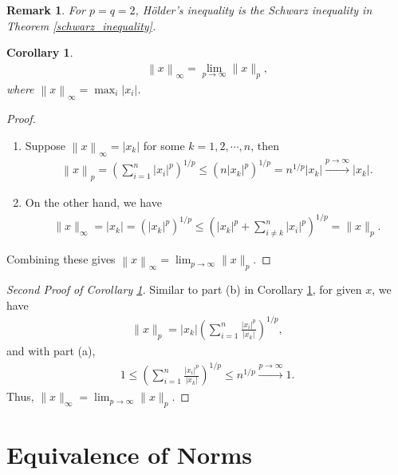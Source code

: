 \documentclass[11pt]{book}
\newtheorem{corollary}{Corollary}[theorem]
\newtheorem{remark}{Remark}[chapter]
\theoremstyle{definition}
\numberwithin{equation}{chapter}
\begin{document}
\begin{remark}
For $p = q = 2$, Hölder's inequality is the Schwarz inequality in Theorem \ref{schwarz_inequality}.
\end{remark}

\medskip

\begin{corollary}\label{norm_limit_corollary}
\begin{align*}
    \left\|x\right\|_\infty = \lim_{p\to\infty} \|x\|_p,
\end{align*}
where $\left\|x\right\|_\infty = \max_{i}|x_i|$.
\end{corollary}
\begin{proof}
~\begin{enumerate}[label=(\alph*)]
    \item Suppose $\left\|x\right\|_\infty = |x_k|$ for some $k = 1,2,\cdots, n$, then
    \begin{align*}
        \left\|x\right\|_p = \left(\sum^n_{i=1}|x_i|^p\right)^{1/p} \leq \left(n |x_k|^p\right)^{1/p} = n^{1/p} |x_k| \xrightarrow[]{p\to\infty} |x_k|.
    \end{align*}
    
    \item On the other hand, we have
    \begin{align*}
        \|x\|_\infty = |x_k| = \left(|x_k|^p\right)^{1/p} \leq \left(|x_k|^p + \sum^n_{i\neq k} |x_i|^p \right)^{1/p} = \|x\|_p.
    \end{align*}
\end{enumerate}
Combining these gives $\left\|x\right\|_\infty = \lim_{p\to\infty} \|x\|_p$.
\end{proof}

\begin{proof}[Second Proof of Corollary \ref{norm_limit_corollary}]
Similar to part (b) in Corollary \ref{norm_limit_corollary}, for given $x$, we have
\begin{align*}
    \|x\|_p = |x_k| \left(\sum^n_{i=1} \frac{|x_i|^p}{|x_k|} \right)^{1/p},
\end{align*}
and with part (a),
\begin{align*}
    1 \leq \left(\sum^n_{i=1} \frac{|x_i|^p}{|x_k|} \right)^{1/p} \leq n^{1/p} \xrightarrow[]{p\to\infty} 1.
\end{align*}
Thus, $\|x\|_\infty = \lim_{p\to\infty} \|x\|_p$.
\end{proof}

\medskip

\section{Equivalence of Norms}
\end{document}
